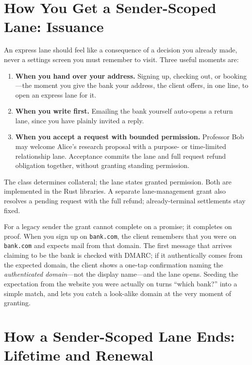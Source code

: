 \documentclass[11pt]{article}
\begin{document}
\section{How You Get a Sender-Scoped Lane: Issuance}

An express lane should feel like a consequence of a decision you already made,
never a settings screen you must remember to visit. Three useful moments are:

\begin{enumerate}[leftmargin=2em]
    \item \textbf{When you hand over your address.} Signing up, checking out, or
    booking---the moment you give the bank your address, the client offers, in
    one line, to open an express lane for it.
    \item \textbf{When you write first.} Emailing the bank yourself auto-opens a
    return lane, since you have plainly invited a reply.
    \item \textbf{When you accept a request with bounded permission.} Professor
    Bob may welcome Alice's research proposal with a purpose- or time-limited
    relationship lane. Acceptance commits the lane and full request refund
    obligation together, without granting standing permission.
\end{enumerate}

The class determines collateral; the lane states granted permission. Both are
implemented in the Rust libraries. A separate lane-management grant also resolves
a pending request with the full refund; already-terminal settlements stay fixed.

For a legacy sender the grant cannot complete on a promise; it completes on proof.
When you sign up on \texttt{bank.com}, the client remembers that you were on
\texttt{bank.com} and expects mail from that domain. The first message that
arrives claiming to be the bank is checked with DMARC; if it authentically comes
from the expected domain, the client shows a one-tap confirmation naming the
\emph{authenticated domain}---not the display name---and the lane opens. Seeding
the expectation from the website you were actually on turns ``which bank?'' into a
simple match, and lets you catch a look-alike domain at the very moment of
granting.

\section{How a Sender-Scoped Lane Ends: Lifetime and Renewal}
\end{document}
